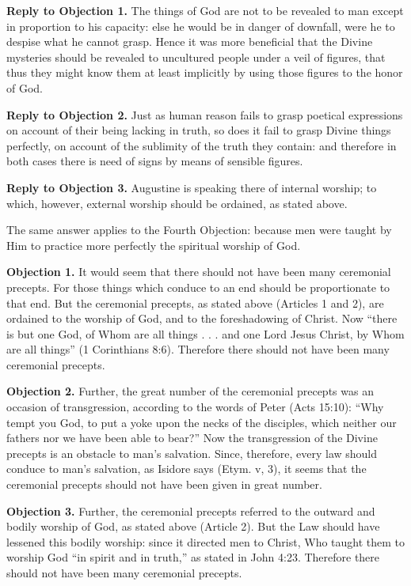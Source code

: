 \textbf{Reply to Objection 1.} The things of God are not to be revealed to man except in proportion to his capacity: else he would be in danger of downfall, were he to despise what he cannot grasp. Hence it was more beneficial that the Divine mysteries should be revealed to uncultured people under a veil of figures, that thus they might know them at least implicitly by using those figures to the honor of God.

\textbf{Reply to Objection 2.} Just as human reason fails to grasp poetical expressions on account of their being lacking in truth, so does it fail to grasp Divine things perfectly, on account of the sublimity of the truth they contain: and therefore in both cases there is need of signs by means of sensible figures.

\textbf{Reply to Objection 3.} Augustine is speaking there of internal worship; to which, however, external worship should be ordained, as stated above.

The same answer applies to the Fourth Objection: because men were taught by Him to practice more perfectly the spiritual worship of God.


\textbf{Objection 1.} It would seem that there should not have been many ceremonial precepts. For those things which conduce to an end should be proportionate to that end. But the ceremonial precepts, as stated above (Articles 1 and 2), are ordained to the worship of God, and to the foreshadowing of Christ. Now ``there is but one God, of Whom are all things . . . and one Lord Jesus Christ, by Whom are all things'' (1 Corinthians 8:6). Therefore there should not have been many ceremonial precepts.

\textbf{Objection 2.} Further, the great number of the ceremonial precepts was an occasion of transgression, according to the words of Peter (Acts 15:10): ``Why tempt you God, to put a yoke upon the necks of the disciples, which neither our fathers nor we have been able to bear?'' Now the transgression of the Divine precepts is an obstacle to man's salvation. Since, therefore, every law should conduce to man's salvation, as Isidore says (Etym. v, 3), it seems that the ceremonial precepts should not have been given in great number.

\textbf{Objection 3.} Further, the ceremonial precepts referred to the outward and bodily worship of God, as stated above (Article 2). But the Law should have lessened this bodily worship: since it directed men to Christ, Who taught them to worship God ``in spirit and in truth,'' as stated in John 4:23. Therefore there should not have been many ceremonial precepts.

